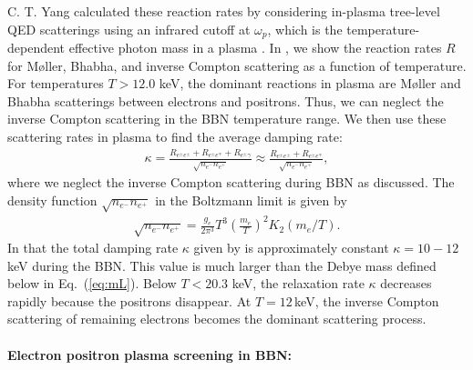 C. T. Yang calculated these reaction rates by considering in-plasma tree-level QED scatterings using an infrared cutoff at $\omega_p$, which is the temperature-dependent effective photon mass in a plasma \cite{Yang:2024ret}.
In , we show the reaction rates $R$ for M{\o}ller, Bhabha, and inverse Compton scattering as a function of temperature. For temperatures $T>12.0$ keV, the dominant reactions in plasma are M{\o}ller and Bhabha scatterings between electrons and positrons. Thus, we can neglect the inverse Compton scattering in the BBN temperature range.
We then use these scattering rates in plasma to find the average damping rate:
\begin{align}\label{Eq:Kappa}
\kappa=\frac{R_{e^\pm e^\pm}+R_{e^\pm e^\mp}+R_{e^\pm\gamma}}{\sqrt{n_{e^-}n_{e^+}}}\approx\frac{R_{e^\pm e^\pm}+R_{e^\pm e^\mp}}{\sqrt{n_{e^-}n_{e^+}}},
\end{align}
where we neglect the inverse Compton scattering during BBN as discussed. The density function ${\sqrt{n_{e^-}n_{e^+}}}$ in the Boltzmann limit is given by
\begin{align}
{\sqrt{n_{e^-}n_{e^+}}}=\frac{g_e}{2\pi^3}T^3\left(\frac{m_e}{T}\right)^2K_2(m_e/T).
\end{align}
In  that the total damping rate $\kappa$ given by    is approximately constant $\kappa=10-12$ keV during the BBN. This value is much larger than the Debye mass defined below in Eq.~(\ref{eq:mL}). Below $T<20.3$ keV, the relaxation rate $\kappa$ decreases rapidly because the positrons disappear. At $T=12$\,keV, the inverse Compton scattering of remaining electrons becomes the dominant scattering process. 

\paragraph{Electron positron plasma screening in BBN:}\label{sec:Discussion}

